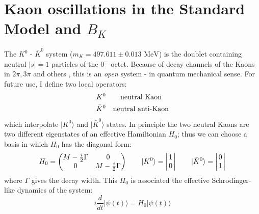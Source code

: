 \documentclass[english, LaM, oneside, noexaminfo]{sapthesis}
\newcommand{\kkb}{$K^0$ - $\bar K^0$ }
\newcommand{\ra}{\rangle}
\newcommand{\mev}{\text{ MeV}}
\begin{document}
\section{Kaon oscillations in the Standard Model and $B_K$}
\noindent
The \kkb system ($m_K = 497.611 \pm 0.013 \mev$) is the doublet containing neutral $|s| = 1$ particles of the $0^-$ octet.
Because of decay channels of the Kaons in $2\pi, 3\pi$ and others \cite{ParticleDataGroup}, this is an \textit{open} system - in quantum mechanical sense.
For future use, I define two local operators:
\begin{equation}\label{eq:kkbar-operators}
    \begin{aligned}
        & K^0 & \text{neutral Kaon \space \space} \\
        & \bar K^0 & \text{neutral anti-Kaon}
    \end{aligned}
\end{equation}
which interpolate $| K^0\ra$ and $|\bar K^0\ra$ states.
In principle the two neutral Kaons are two different eigenstates of an effective Hamiltonian $H_0$;
thus we can choose a basis in which $H_0$ has the diagonal form:
\begin{equation*}
    H_0 =
    \begin{pmatrix}
        M - \frac{i}{2}\Gamma & 0 \\
        0 & M - \frac{i}{2}\Gamma
    \end{pmatrix}
    \qquad | K^0 \ra = 
    \begin{vmatrix}
        \hspace*{0.5mm} 1 \hspace*{0.5mm} \\ \hspace*{0.5mm} 0 \hspace*{0.5mm}
    \end{vmatrix}
    \qquad | \bar K^0 \ra = 
    \begin{vmatrix}
        \hspace*{0.5mm} 0 \hspace*{0.5mm} \\ \hspace*{0.5mm} 1 \hspace*{0.5mm}
    \end{vmatrix}
\end{equation*}
where $\Gamma$ gives the decay width.
This $H_0$ is associated the effective Schrodinger-like dynamics of the system:
\begin{equation*}
    i\frac{d}{d t} | \psi (t) \ra = H_0 | \psi (t) \ra
\end{equation*}
\end{document}
